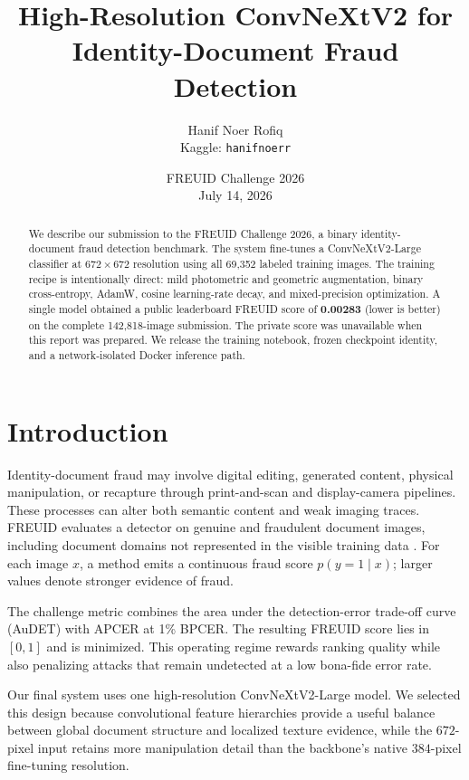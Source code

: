 \documentclass[10pt,twocolumn]{article}
\title{High-Resolution ConvNeXtV2 for Identity-Document Fraud Detection}
\author{Hanif Noer Rofiq\\
\small Kaggle: \texttt{hanifnoerr}}
\date{FREUID Challenge 2026\\July 14, 2026}
\begin{document}
\maketitle

\begin{abstract}
We describe our submission to the FREUID Challenge 2026, a binary
identity-document fraud detection benchmark. The system fine-tunes a
ConvNeXtV2-Large classifier at $672\!\times\!672$ resolution using all 69,352
labeled training images. The training recipe is intentionally direct: mild
photometric and geometric augmentation, binary cross-entropy, AdamW, cosine
learning-rate decay, and mixed-precision optimization. A single model obtained
a public leaderboard FREUID score of \textbf{0.00283} (lower is better) on the
complete 142,818-image submission. The
private score was unavailable when this report was prepared. We release the
training notebook, frozen checkpoint identity, and a network-isolated Docker
inference path.
\end{abstract}

\section{Introduction}
Identity-document fraud may involve digital editing, generated content,
physical manipulation, or recapture through print-and-scan and display-camera
pipelines. These processes can alter both semantic content and weak imaging
traces. FREUID evaluates a detector on genuine and fraudulent document images,
including document domains not represented in the visible training data
\cite{the-freuid-challenge-2026-ijcai-ecai}. For each image $x$, a method emits
a continuous fraud score $p(y=1\mid x)$; larger values denote stronger evidence
of fraud.

The challenge metric combines the area under the detection-error trade-off
curve (AuDET) with APCER at 1\% BPCER. The resulting FREUID score lies in
$[0,1]$ and is minimized. This operating regime rewards ranking quality while
also penalizing attacks that remain undetected at a low bona-fide error rate.

Our final system uses one high-resolution ConvNeXtV2-Large model. We selected
this design because convolutional feature hierarchies provide a useful balance
between global document structure and localized texture evidence, while the
$672$-pixel input retains more manipulation detail than the backbone's native
$384$-pixel fine-tuning resolution.
\end{document}
